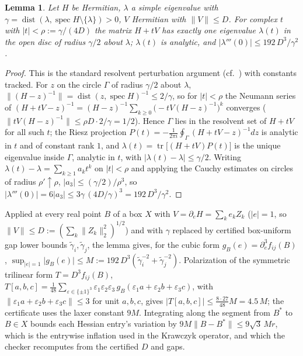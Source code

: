 \documentclass[11pt]{amsart}
\DeclareMathOperator{\dist}{dist}
\DeclareMathOperator{\tr}{tr}
\theoremstyle{plain}
\newtheorem{lemma}[theorem]{Lemma}
\theoremstyle{definition}
\theoremstyle{remark}
\begin{document}
\begin{lemma}\label{lem:cauchy}
Let $H$ be Hermitian, $\lambda$ a simple eigenvalue with
$\gamma=\dist(\lambda,\operatorname{spec}H\setminus\{\lambda\})>0$, $V$
Hermitian with $\|V\|\le D$.  For complex $t$ with $\lvert t\rvert<\rho:=
\gamma/(4D)$ the matrix $H+tV$ has exactly one eigenvalue $\lambda(t)$ in the
open disc of radius $\gamma/2$ about $\lambda$; $\lambda(t)$ is analytic, and
$\bigl|\lambda'''(0)\bigr|\le 192\,D^3/\gamma^2$.
\end{lemma}

\begin{proof}
This is the standard resolvent perturbation argument (cf.\ \cite{Kato}) with
constants tracked.  For $z$ on the circle $\Gamma$ of radius $\gamma/2$ about
$\lambda$,
$\|(H-z)^{-1}\|=\dist(z,\operatorname{spec}H)^{-1}\le2/\gamma$, so for
$\lvert t\rvert<\rho$ the Neumann series of
$(H+tV-z)^{-1}=(H-z)^{-1}\sum_{k\ge0}\bigl(-tV(H-z)^{-1}\bigr)^k$ converges
($\lVert tV(H-z)^{-1}\rVert\le\rho D\cdot2/\gamma=1/2$).  Hence $\Gamma$ lies
in the resolvent set of $H+tV$ for all such $t$; the Riesz projection
$P(t)=-\frac1{2\pi i}\oint_\Gamma(H+tV-z)^{-1}dz$ is analytic in $t$ and of
constant rank $1$, and $\lambda(t)=\tr\bigl[(H+tV)P(t)\bigr]$ is the unique
eigenvalue inside $\Gamma$, analytic in $t$, with
$\lvert\lambda(t)-\lambda\rvert\le\gamma/2$.  Writing
$\lambda(t)-\lambda=\sum_{k\ge1}a_kt^k$ on $\lvert t\rvert<\rho$ and applying
the Cauchy estimates on circles of radius $\rho'\uparrow\rho$,
$\lvert a_3\rvert\le(\gamma/2)/\rho^3$, so
$\lvert\lambda'''(0)\rvert=6\lvert a_3\rvert\le3\gamma\,(4D/\gamma)^3
=192\,D^3/\gamma^2$.
\end{proof}

Applied at every real point $B$ of a box $X$ with $V=\partial_e H=\sum_k e_k
Z_k$ ($\lvert e\rvert=1$, so $\|V\|\le D:=(\sum_k\|Z_k\|_2^2)^{1/2}$) and with
$\gamma$ replaced by certified box-uniform gap lower bounds
$\tilde\gamma_i,\tilde\gamma_j$, the lemma gives, for the cubic form
$g_B(e)=\partial_e^3 f_{ij}(B)$,
$\sup_{\lvert e\rvert=1}\lvert g_B(e)\rvert\le
M:=192\,D^3(\tilde\gamma_i^{-2}+\tilde\gamma_j^{-2})$.  Polarization of the
symmetric trilinear form $T=D^3f_{ij}(B)$,
$T[a,b,c]=\frac1{48}\sum_{\varepsilon\in\{\pm1\}^3}\varepsilon_1\varepsilon_2
\varepsilon_3\,g_B(\varepsilon_1a+\varepsilon_2b+\varepsilon_3c)$, with
$\lVert\varepsilon_1a+\varepsilon_2b+\varepsilon_3c\rVert\le3$ for unit
$a,b,c$, gives $\lvert T[a,b,c]\rvert\le\frac{8\cdot27}{48}M=4.5\,M$; the
certificate uses the laxer constant $9M$.  Integrating along the segment from
$B^*$ to $B\in X$ bounds each Hessian entry's variation by
$9M\lVert B-B^*\rVert\le9\sqrt3\,Mr$, which is the entrywise inflation used in
the Krawczyk operator, and which the checker recomputes from the certified
$D$ and gaps.
\end{document}
